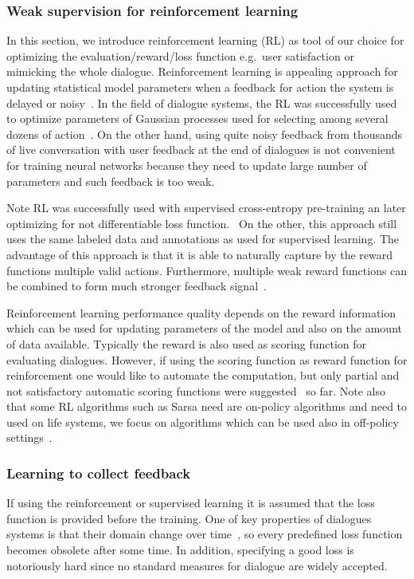 \documentclass[11pt]{article}
\begin{document}
\subsubsection*{Weak supervision for reinforcement learning}\label{sub:batch_rl}

In this section, we introduce reinforcement learning (RL) as tool of our choice for optimizing the evaluation/reward/loss function e.g.\ user satisfaction or mimicking the whole dialogue.
Reinforcement learning is appealing approach for updating statistical model parameters when a feedback for action the system is delayed or noisy~\cite{williams2016end,bahdanau_actor-critic_2016,wierstra_recurrent_2010}.
In the field of dialogue systems, the RL was successfully used to optimize parameters of Gaussian processes used for selecting among several dozens of action~\cite{gasic2011line}.
On the other hand, using quite noisy feedback from thousands of live conversation with user feedback at the end of dialogues is not convenient for training neural networks because they need to update large number of parameters and such feedback is too weak.

Note RL was successfully used with supervised cross-entropy pre-training an later optimizing for not differentiable loss function.~\cite{williams2016end}
On the other, this approach still uses the same labeled data and annotations as used for supervised learning.
The advantage of this approach is that it is able to naturally capture by the reward functions multiple valid actions.
Furthermore, multiple weak reward functions can be combined to form much stronger feedback signal~\cite{abbeel_apprenticeship_2004}.

Reinforcement learning performance quality depends on the reward information which can be used for updating parameters of the model and also on the amount of data available.
Typically the reward is also used as scoring function for evaluating dialogues.
However, if using the scoring function as reward function for reinforcement one would like to automate the computation, but only partial and not satisfactory automatic scoring functions were suggested~\cite{liu_how_2016,lowe_evaluation_2016} so far. 
Note also that some RL algorithms such as Sarsa need are on-policy algorithms and need to used on life systems, we focus on algorithms which can be used also in off-policy settings~\cite{sutton_reinforcement_1998}.

\subsubsection*{Learning to collect feedback}\label{sub:irl}
If using the reinforcement or supervised learning it is assumed that the loss function is provided before the training.
One of key properties of dialogues systems is that their domain change over time~\cite{yu_evolvable_2016}, so every predefined loss function becomes obsolete after some time.
In addition, specifying a good loss is notoriously hard since no standard measures for dialogue are widely accepted.
\end{document}
